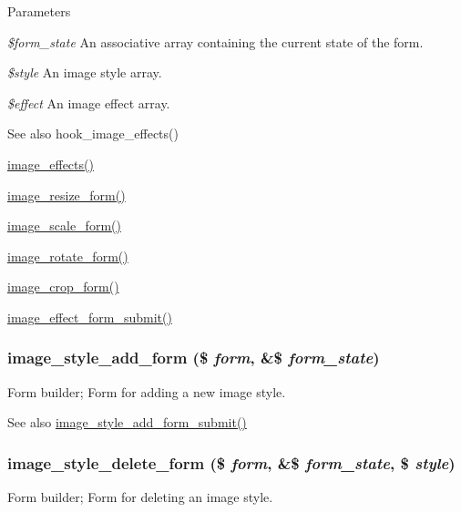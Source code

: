 \begin{DoxyParams}{Parameters}
\item[{\em \$form\_\-state}]An associative array containing the current state of the form. \item[{\em \$style}]An image style array. \item[{\em \$effect}]An image effect array.\end{DoxyParams}
\begin{DoxySeeAlso}{See also}
hook\_\-image\_\-effects() 

\hyperlink{image_8module_ae0237054a43c19118bf13e609e5cff8b}{image\_\-effects()} 

\hyperlink{image_8admin_8inc_abe6ab1b2613696b2dc0914c0dc1c8031}{image\_\-resize\_\-form()} 

\hyperlink{image_8admin_8inc_a0cef54d6978f87588088549e59c18363}{image\_\-scale\_\-form()} 

\hyperlink{image_8admin_8inc_a639fc7193d6ac3c7377e244beb2d114f}{image\_\-rotate\_\-form()} 

\hyperlink{image_8admin_8inc_a9d54a4b791373a6f383894146a8e8d73}{image\_\-crop\_\-form()} 

\hyperlink{image_8admin_8inc_aab999018d03bcbfde679bb79edcb4e34}{image\_\-effect\_\-form\_\-submit()} 
\end{DoxySeeAlso}
\hypertarget{group__forms_gaee4ef5746d1f8f6e3dda5fae710d4d8d}{
\subsubsection[{image\_\-style\_\-add\_\-form}]{\setlength{\rightskip}{0pt plus 5cm}image\_\-style\_\-add\_\-form (\$ {\em form}, \/  \&\$ {\em form\_\-state})}}
\label{group__forms_gaee4ef5746d1f8f6e3dda5fae710d4d8d}
Form builder; Form for adding a new image style.

\begin{DoxySeeAlso}{See also}
\hyperlink{image_8admin_8inc_a31634c0c7dfaaf010ad5748f1c39ee15}{image\_\-style\_\-add\_\-form\_\-submit()} 
\end{DoxySeeAlso}
\hypertarget{group__forms_gae419759130d231f0fa8cc6ef293c2b12}{
\subsubsection[{image\_\-style\_\-delete\_\-form}]{\setlength{\rightskip}{0pt plus 5cm}image\_\-style\_\-delete\_\-form (\$ {\em form}, \/  \&\$ {\em form\_\-state}, \/  \$ {\em style})}}
\label{group__forms_gae419759130d231f0fa8cc6ef293c2b12}
Form builder; Form for deleting an image style.


